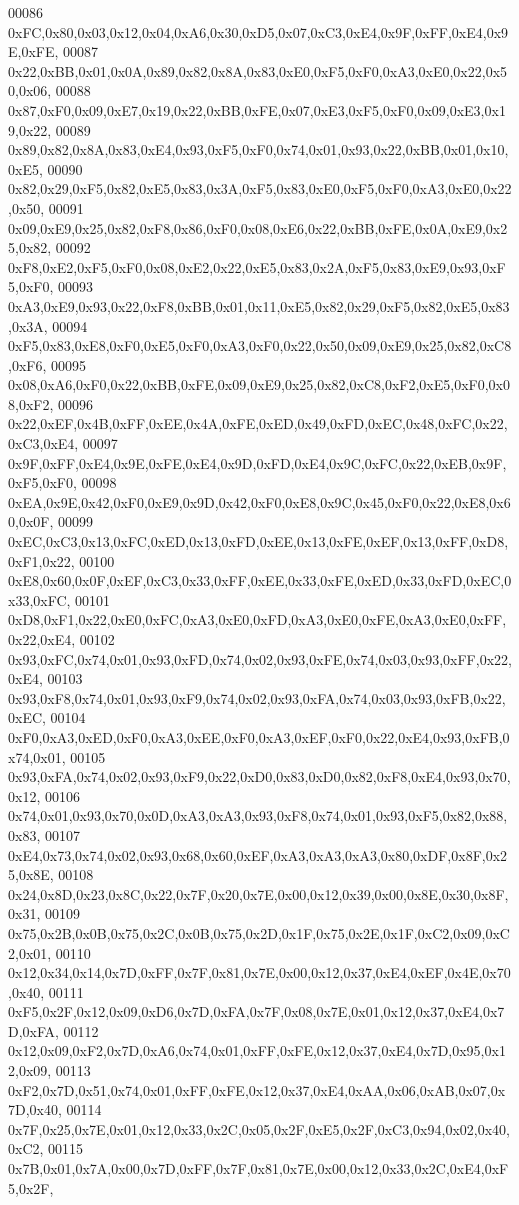 \begin{DoxyCode}
00086 0xFC,0x80,0x03,0x12,0x04,0xA6,0x30,0xD5,0x07,0xC3,0xE4,0x9F,0xFF,0xE4,0x9E,0xFE,
00087 0x22,0xBB,0x01,0x0A,0x89,0x82,0x8A,0x83,0xE0,0xF5,0xF0,0xA3,0xE0,0x22,0x50,0x06,
00088 0x87,0xF0,0x09,0xE7,0x19,0x22,0xBB,0xFE,0x07,0xE3,0xF5,0xF0,0x09,0xE3,0x19,0x22,
00089 0x89,0x82,0x8A,0x83,0xE4,0x93,0xF5,0xF0,0x74,0x01,0x93,0x22,0xBB,0x01,0x10,0xE5,
00090 0x82,0x29,0xF5,0x82,0xE5,0x83,0x3A,0xF5,0x83,0xE0,0xF5,0xF0,0xA3,0xE0,0x22,0x50,
00091 0x09,0xE9,0x25,0x82,0xF8,0x86,0xF0,0x08,0xE6,0x22,0xBB,0xFE,0x0A,0xE9,0x25,0x82,
00092 0xF8,0xE2,0xF5,0xF0,0x08,0xE2,0x22,0xE5,0x83,0x2A,0xF5,0x83,0xE9,0x93,0xF5,0xF0,
00093 0xA3,0xE9,0x93,0x22,0xF8,0xBB,0x01,0x11,0xE5,0x82,0x29,0xF5,0x82,0xE5,0x83,0x3A,
00094 0xF5,0x83,0xE8,0xF0,0xE5,0xF0,0xA3,0xF0,0x22,0x50,0x09,0xE9,0x25,0x82,0xC8,0xF6,
00095 0x08,0xA6,0xF0,0x22,0xBB,0xFE,0x09,0xE9,0x25,0x82,0xC8,0xF2,0xE5,0xF0,0x08,0xF2,
00096 0x22,0xEF,0x4B,0xFF,0xEE,0x4A,0xFE,0xED,0x49,0xFD,0xEC,0x48,0xFC,0x22,0xC3,0xE4,
00097 0x9F,0xFF,0xE4,0x9E,0xFE,0xE4,0x9D,0xFD,0xE4,0x9C,0xFC,0x22,0xEB,0x9F,0xF5,0xF0,
00098 0xEA,0x9E,0x42,0xF0,0xE9,0x9D,0x42,0xF0,0xE8,0x9C,0x45,0xF0,0x22,0xE8,0x60,0x0F,
00099 0xEC,0xC3,0x13,0xFC,0xED,0x13,0xFD,0xEE,0x13,0xFE,0xEF,0x13,0xFF,0xD8,0xF1,0x22,
00100 0xE8,0x60,0x0F,0xEF,0xC3,0x33,0xFF,0xEE,0x33,0xFE,0xED,0x33,0xFD,0xEC,0x33,0xFC,
00101 0xD8,0xF1,0x22,0xE0,0xFC,0xA3,0xE0,0xFD,0xA3,0xE0,0xFE,0xA3,0xE0,0xFF,0x22,0xE4,
00102 0x93,0xFC,0x74,0x01,0x93,0xFD,0x74,0x02,0x93,0xFE,0x74,0x03,0x93,0xFF,0x22,0xE4,
00103 0x93,0xF8,0x74,0x01,0x93,0xF9,0x74,0x02,0x93,0xFA,0x74,0x03,0x93,0xFB,0x22,0xEC,
00104 0xF0,0xA3,0xED,0xF0,0xA3,0xEE,0xF0,0xA3,0xEF,0xF0,0x22,0xE4,0x93,0xFB,0x74,0x01,
00105 0x93,0xFA,0x74,0x02,0x93,0xF9,0x22,0xD0,0x83,0xD0,0x82,0xF8,0xE4,0x93,0x70,0x12,
00106 0x74,0x01,0x93,0x70,0x0D,0xA3,0xA3,0x93,0xF8,0x74,0x01,0x93,0xF5,0x82,0x88,0x83,
00107 0xE4,0x73,0x74,0x02,0x93,0x68,0x60,0xEF,0xA3,0xA3,0xA3,0x80,0xDF,0x8F,0x25,0x8E,
00108 0x24,0x8D,0x23,0x8C,0x22,0x7F,0x20,0x7E,0x00,0x12,0x39,0x00,0x8E,0x30,0x8F,0x31,
00109 0x75,0x2B,0x0B,0x75,0x2C,0x0B,0x75,0x2D,0x1F,0x75,0x2E,0x1F,0xC2,0x09,0xC2,0x01,
00110 0x12,0x34,0x14,0x7D,0xFF,0x7F,0x81,0x7E,0x00,0x12,0x37,0xE4,0xEF,0x4E,0x70,0x40,
00111 0xF5,0x2F,0x12,0x09,0xD6,0x7D,0xFA,0x7F,0x08,0x7E,0x01,0x12,0x37,0xE4,0x7D,0xFA,
00112 0x12,0x09,0xF2,0x7D,0xA6,0x74,0x01,0xFF,0xFE,0x12,0x37,0xE4,0x7D,0x95,0x12,0x09,
00113 0xF2,0x7D,0x51,0x74,0x01,0xFF,0xFE,0x12,0x37,0xE4,0xAA,0x06,0xAB,0x07,0x7D,0x40,
00114 0x7F,0x25,0x7E,0x01,0x12,0x33,0x2C,0x05,0x2F,0xE5,0x2F,0xC3,0x94,0x02,0x40,0xC2,
00115 0x7B,0x01,0x7A,0x00,0x7D,0xFF,0x7F,0x81,0x7E,0x00,0x12,0x33,0x2C,0xE4,0xF5,0x2F,

\end{DoxyCode}
